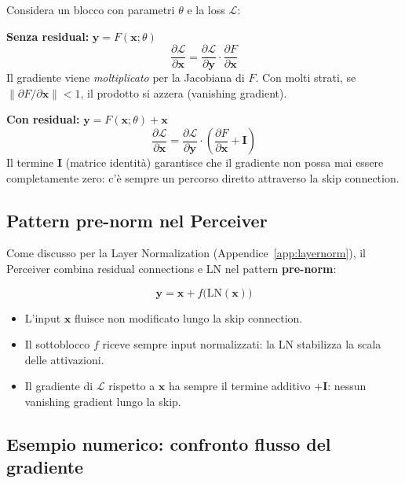 \documentclass[
  11pt,
]{article}
\begin{document}
\begin{notabox}[title={\textbf{Analisi del gradiente con e senza residual connection}}]
Considera un blocco con parametri $\theta$ e la loss $\mathcal{L}$:

\textbf{Senza residual:} $\mathbf{y} = F(\mathbf{x}; \theta)$
\[
\frac{\partial \mathcal{L}}{\partial \mathbf{x}} = \frac{\partial \mathcal{L}}{\partial \mathbf{y}} \cdot \frac{\partial F}{\partial \mathbf{x}}
\]
Il gradiente viene \emph{moltiplicato} per la Jacobiana di $F$. Con molti strati, se $\|\partial F / \partial \mathbf{x}\| < 1$, il prodotto si azzera (vanishing gradient).

\textbf{Con residual:} $\mathbf{y} = F(\mathbf{x}; \theta) + \mathbf{x}$
\[
\frac{\partial \mathcal{L}}{\partial \mathbf{x}} = \frac{\partial \mathcal{L}}{\partial \mathbf{y}} \cdot \left(\frac{\partial F}{\partial \mathbf{x}} + \mathbf{I}\right)
\]
Il termine $\mathbf{I}$ (matrice identità) garantisce che il gradiente non possa mai essere completamente zero: c'è sempre un percorso diretto attraverso la skip connection.
\end{notabox}

\subsection{Pattern pre-norm nel Perceiver}

Come discusso per la Layer Normalization (Appendice~\ref{app:layernorm}), il Perceiver combina residual connections e LN nel pattern \textbf{pre-norm}:

\begin{formulabox}[title={\textbf{Blocco residuale con pre-norm}}]
\[
\mathbf{y} = \mathbf{x} + f\!\bigl(\text{LN}(\mathbf{x})\bigr)
\]
\end{formulabox}

\begin{itemize}
  \item L'input $\mathbf{x}$ fluisce non modificato lungo la skip connection.
  \item Il sottoblocco $f$ riceve sempre input normalizzati: la LN stabilizza la scala delle attivazioni.
  \item Il gradiente di $\mathcal{L}$ rispetto a $\mathbf{x}$ ha sempre il termine additivo $+\mathbf{I}$: nessun vanishing gradient lungo la skip.
\end{itemize}

\subsection{Esempio numerico: confronto flusso del gradiente}
\end{document}
